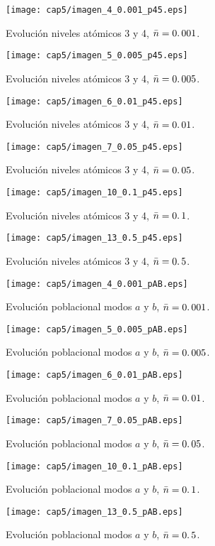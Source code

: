 \begin{figure}[ht]
\centering
\texttt{[image: cap5/imagen\_4\_0.001\_p45.eps]}\caption{Evoluci\'on niveles at\'omicos 3 y 4, $\bar{n}=0\ldotp 001$.}\label{fig:niveles_45_4_0001}
\end{figure}
\begin{figure}[ht]
\centering
\texttt{[image: cap5/imagen\_5\_0.005\_p45.eps]}\caption{Evoluci\'on niveles at\'omicos 3 y 4, $\bar{n}=0\ldotp 005$.}\label{fig:niveles_45_5_0005}
\end{figure}
\begin{figure}[ht]
\centering
\texttt{[image: cap5/imagen\_6\_0.01\_p45.eps]}\caption{Evoluci\'on niveles at\'omicos 3 y 4, $\bar{n}=0\ldotp 01$.}\label{fig:niveles_45_6_001}
\texttt{[image: cap5/imagen\_7\_0.05\_p45.eps]}\caption{Evoluci\'on niveles at\'omicos 3 y 4, $\bar{n}=0\ldotp 05$.}\label{fig:niveles_45_7_005}
\end{figure}
\begin{figure}[ht]
\centering
\texttt{[image: cap5/imagen\_10\_0.1\_p45.eps]}\caption{Evoluci\'on niveles at\'omicos 3 y 4, $\bar{n}=0\ldotp 1$.}\label{fig:niveles_45_10_01}
\texttt{[image: cap5/imagen\_13\_0.5\_p45.eps]}\caption{Evoluci\'on niveles at\'omicos 3 y 4, $\bar{n}=0\ldotp 5$.}\label{fig:niveles_45_13_05}
\end{figure}


\begin{figure}[ht]
\centering
 \texttt{[image: cap5/imagen\_4\_0.001\_pAB.eps]}\caption{Evoluci\'on poblacional modos $a$ y $b$, $\bar{n}=0\ldotp 001$.}\label{fig:modos_ab_4_0001}
 \texttt{[image: cap5/imagen\_5\_0.005\_pAB.eps]}\caption{Evoluci\'on poblacional modos $a$ y $b$, $\bar{n}=0\ldotp 005$.}\label{fig:modos_ab_5_0005}
\end{figure}
\begin{figure}[ht]
\centering
 \texttt{[image: cap5/imagen\_6\_0.01\_pAB.eps]}\caption{Evoluci\'on poblacional modos $a$ y $b$, $\bar{n}=0\ldotp 01$.}\label{fig:modos_ab_6_001}
 \texttt{[image: cap5/imagen\_7\_0.05\_pAB.eps]}\caption{Evoluci\'on poblacional modos $a$ y $b$, $\bar{n}=0\ldotp 05$.}\label{fig:modos_ab_7_005}
\end{figure}
\begin{figure}[ht]
\centering
 \texttt{[image: cap5/imagen\_10\_0.1\_pAB.eps]}\caption{Evoluci\'on poblacional modos $a$ y $b$, $\bar{n}=0\ldotp 1$.}\label{fig:modos_ab_10_01}
 \texttt{[image: cap5/imagen\_13\_0.5\_pAB.eps]}\caption{Evoluci\'on poblacional modos $a$ y $b$, $\bar{n}=0\ldotp 5$.}\label{fig:modos_ab_13_05}
\end{figure}
\clearpage
